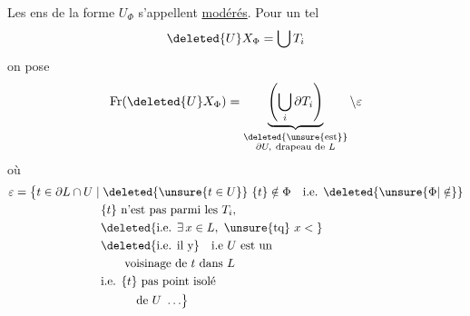 Les ens de la forme $U_{\Phi}$ s'appellent \uline{modérés}. Pour un tel
\[
\deleted{U}X_{\Phi}=\bigcup T_i
\]
on pose
\[
\operatorname{Fr}(\deleted{U}X_{\Phi})=
\underbrace{\left(\bigcup_i\partial T_i\right)}_{\substack{\deleted{\text{\unsure{est}}}\\\partial U,\ \text{drapeau de } L}}\setminus\varepsilon
\]
où
\[
\begin{aligned}
\varepsilon={}&\bigl\{t\in\partial L\cap U\mid
  \deleted{\unsure{t\in U}}\ \{t\}\notin\Phi\quad\text{i.e. }\deleted{\unsure{\Phi|\notin}}\\
&\hspace{6em}\{t\}\text{ n'est pas parmi les }T_i,\\
&\hspace{6em}\deleted{\text{i.e. }\exists\,x\in L,\ \text{\unsure{tq} } x<{}}\\
&\hspace{6em}\deleted{\text{i.e. il y}}\quad\text{i.e }U\text{ est un}\\
&\hspace{8em}\text{voisinage de }t\text{ dans } L\\
&\hspace{6em}\text{i.e. }\{t\}\text{ pas point isolé}\\
&\hspace{9em}\text{de }U\ \ldots\bigr\}
\end{aligned}
\]

